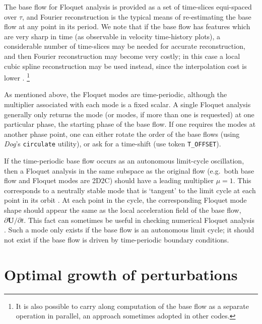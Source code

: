 \documentclass[11pt,a4paper]{report}
\newcommand\Rey{\mbox{\textit{Re}}}
\newcommand{\eg}{e.g.\ }
\newcommand\Ubase{{\bm{U}}}
\newcommand{\Dog}{\emph{Dog}}
\begin{document}
The base flow for Floquet analysis is provided as a set of time-slices
equi-spaced over $\tau$, and Fourier reconstruction is the typical
means of re-estimating the base flow at any point in its period.  We
note that if the base flow has features which are very sharp in time
(as observable in velocity time-history plots), a considerable number
of time-slices may be needed for accurate reconstruction, and then
Fourier reconstruction may become very costly; in this case a local
cubic spline reconstruction may be used instead, since the
interpolation cost is lower \citep[][set \texttt{LAGRANGE\_INT=1} to
  obtain this functionality]{msb11}.
\footnote{It is also possible to carry along computation of the base
  flow as a separate operation in parallel, an approach sometimes
  adopted in other codes.}

As mentioned above, the Floquet modes are time-periodic, although the
multiplier associated with each mode is a fixed scalar.  A single
Floquet analysis generally only returns the mode (or modes, if more
than one is requested) at one particular phase, the starting phase of
the base flow. If one requires the modes at another phase point, one
can either rotate the order of the base flows (using \Dog's
\verb+circulate+ utility), or ask for a time-shift (use token
\verb+T_OFFSET+).

If the time-periodic base flow occurs as an autonomous limit-cycle
oscillation, then a Floquet analysis in the same subspace as the
original flow (\eg both base flow and Floquet modes are 2D2C) should
have a leading multiplier $\mu=1$.  This corresponds to a neutrally
stable mode that is `tangent' to the limit cycle at each point in its
orbit \citep{iooss90}.  At each point in the cycle, the corresponding
Floquet mode shape should appear the same as the local acceleration
field of the base flow, $\partial \Ubase/\partial t$.  This fact can
sometimes be useful in checking numerical Floquet analysis \citep[see
  e.g.][who approached 2D2C in the limit as $\beta\to0$ and found
  $\mu\to1$ over a range of $\Rey$]{bah96}.  Such a mode only exists
if the base flow is an autonomous limit cycle; it should not exist if
the base flow is driven by time-periodic boundary conditions.

\section{Optimal growth of perturbations}
\label{sec.optimal}
\end{document}
